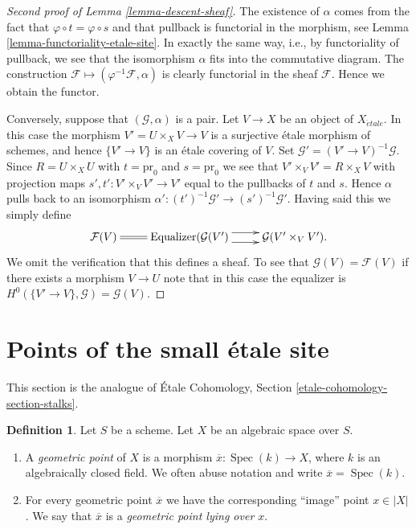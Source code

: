 \documentclass{stacks-project}
\theoremstyle{plain}
\theoremstyle{definition}
\newtheorem{definition}[subsection]{Definition}
\theoremstyle{remark}
\numberwithin{equation}{subsection}
\def\Spec{\mathop{\mathrm{Spec}}}
\def\etale{{\acute{e}tale}}
\begin{document}
\begin{proof}[Second proof of Lemma \ref{lemma-descent-sheaf}]
The existence of $\alpha$ comes from the fact that
$\varphi \circ t = \varphi \circ s$ and that pullback is
functorial in the morphism, see
Lemma \ref{lemma-functoriality-etale-site}.
In exactly the same way, i.e., by functoriality of pullback, we see
that the isomorphism $\alpha$ fits into the commutative diagram.
The construction $\mathcal{F} \mapsto (\varphi^{-1}\mathcal{F}, \alpha)$
is clearly functorial in the sheaf $\mathcal{F}$.
Hence we obtain the functor.

\medskip\noindent
Conversely, suppose that $(\mathcal{G}, \alpha)$ is a pair.
Let $V \to X$ be an object of $X_\etale$.
In this case the morphism $V' = U \times_X V \to V$ is a surjective \'etale
morphism of schemes, and hence $\{V' \to V\}$ is an \'etale
covering of $V$. Set $\mathcal{G}' = (V' \to V)^{-1}\mathcal{G}$.
Since $R = U \times_X U$ with $t = \text{pr}_0$
and $s = \text{pr}_0$ we see that $V' \times_V V' = R \times_X V$
with projection maps $s', t' : V' \times_V V' \to V'$ equal to the pullbacks
of $t$ and $s$. Hence $\alpha$ pulls back to an isomorphism
$\alpha' : (t')^{-1}\mathcal{G}' \to (s')^{-1}\mathcal{G}'$. Having said this
we simply define
$$
\xymatrix{
\mathcal{F}(V) \ar@{=}[r] &
\text{Equalizer}(\mathcal{G}(V') \ar@<1ex>[r] \ar@<-1ex>[r] &
\mathcal{G}(V' \times_V V').
}
$$
We omit the verification that this defines a sheaf. To see that
$\mathcal{G}(V) = \mathcal{F}(V)$ if there exists a morphism $V \to U$
note that in this case the equalizer is
$H^0(\{V' \to V\}, \mathcal{G}) = \mathcal{G}(V)$.
\end{proof}







\section{Points of the small \'etale site}
\label{section-points-small-etale-site}

\noindent
This section is the analogue of
\'Etale Cohomology, Section
\ref{etale-cohomology-section-stalks}.

\begin{definition}
\label{definition-geometric-point}
Let $S$ be a scheme. Let $X$ be an algebraic space over $S$.
\begin{enumerate}
\item A {\it geometric point} of $X$ is a morphism
$\overline{x} : \Spec(k) \to X$, where $k$ is an algebraically
closed field. We often abuse notation and
write $\overline{x} = \Spec(k)$.
\item For every geometric point $\overline{x}$ we have the corresponding
``image'' point $x \in |X|$. We say that $\overline{x}$ is a
{\it geometric point lying over $x$}.
\end{enumerate}
\end{definition}
\end{document}
